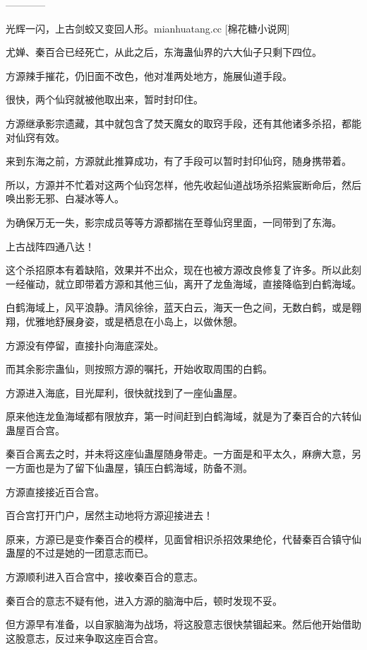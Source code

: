 
\begin{this_body}

------------

光辉一闪，上古剑蛟又变回人形。mianhuatang.cc [棉花糖小说网]

尤婵、秦百合已经死亡，从此之后，东海蛊仙界的六大仙子只剩下四位。

方源辣手摧花，仍旧面不改色，他对准两处地方，施展仙道手段。

很快，两个仙窍就被他取出来，暂时封印住。

方源继承影宗遗藏，其中就包含了焚天魔女的取窍手段，还有其他诸多杀招，都能对仙窍有效。

来到东海之前，方源就此推算成功，有了手段可以暂时封印仙窍，随身携带着。

所以，方源并不忙着对这两个仙窍怎样，他先收起仙道战场杀招紫宸断命后，然后唤出影无邪、白凝冰等人。

为确保万无一失，影宗成员等等方源都揣在至尊仙窍里面，一同带到了东海。

上古战阵四通八达！

这个杀招原本有着缺陷，效果并不出众，现在也被方源改良修复了许多。所以此刻一经催动，就立即带着方源和其他三仙，离开了龙鱼海域，直接降临到白鹤海域。

白鹤海域上，风平浪静。清风徐徐，蓝天白云，海天一色之间，无数白鹤，或是翱翔，优雅地舒展身姿，或是栖息在小岛上，以做休憩。

方源没有停留，直接扑向海底深处。

而其余影宗蛊仙，则按照方源的嘱托，开始收取周围的白鹤。

方源进入海底，目光犀利，很快就找到了一座仙蛊屋。

原来他连龙鱼海域都有限放弃，第一时间赶到白鹤海域，就是为了秦百合的六转仙蛊屋百合宫。

秦百合离去之时，并未将这座仙蛊屋随身带走。一方面是和平太久，麻痹大意，另一方面也是为了留下仙蛊屋，镇压白鹤海域，防备不测。

方源直接接近百合宫。

百合宫打开门户，居然主动地将方源迎接进去！

原来，方源已是变作秦百合的模样，见面曾相识杀招效果绝伦，代替秦百合镇守仙蛊屋的不过是她的一团意志而已。

方源顺利进入百合宫中，接收秦百合的意志。

秦百合的意志不疑有他，进入方源的脑海中后，顿时发现不妥。

但方源早有准备，以自家脑海为战场，将这股意志很快禁锢起来。然后他开始借助这股意志，反过来争取这座百合宫。


\end{this_body}
